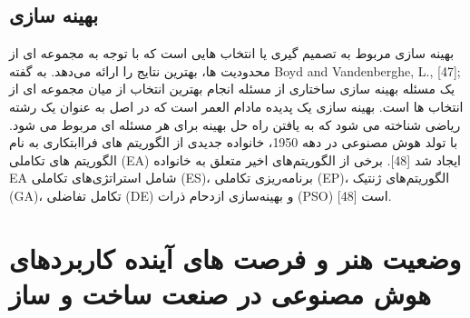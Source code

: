 \documentclass[towcolumn, 11pt]{Article}
\begin{document}
\begin{چکیده}
\subsection{بهینه سازی}
بهینه ‌سازی مربوط به تصمیم ‌گیری یا انتخاب‌ هایی است که با توجه به مجموعه‌ ای از محدودیت ‌ها، بهترین نتایج را ارائه می‌دهد. به گفته Boyd and Vandenberghe, L., [47]; یک مسئله بهینه سازی ساختاری از مسئله انجام بهترین انتخاب از میان مجموعه ای از انتخاب ها است. بهینه سازی یک پدیده مادام العمر است که در اصل به عنوان یک رشته ریاضی شناخته می شود که به یافتن راه حل بهینه برای هر مسئله ای مربوط می شود. با تولد هوش مصنوعی در دهه 1950، خانواده جدیدی از الگوریتم های فراابتکاری به نام الگوریتم های تکاملی (EA) ایجاد شد [48]. برخی از الگوریتم‌های اخیر متعلق به خانواده EA شامل استراتژی‌های تکاملی (ES)، برنامه‌ریزی تکاملی (EP)، الگوریتم‌های ژنتیک (GA)، تکامل تفاضلی (DE) و بهینه‌سازی ازدحام ذرات (PSO) است [48].

\section{وضعیت هنر و فرصت های آینده کاربردهای هوش مصنوعی در صنعت ساخت و ساز}


\end{چکیده}
\end{document}
